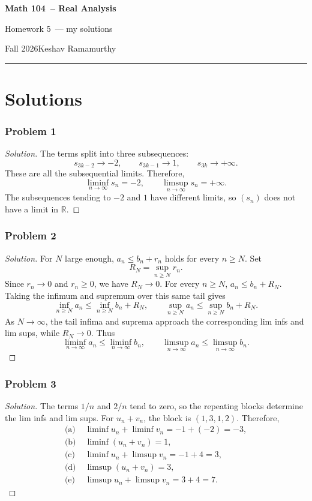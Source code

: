 \documentclass[11pt]{article}
\newcommand{\studentname}{Keshav Ramamurthy}
\newcommand{\coursename}{Math 104}
\newcommand{\courselongname}{Real Analysis}
\newcommand{\assignment}{Homework 5}
\newcommand{\term}{Fall 2026}
\newcommand{\1}{\mathbf{1}}
\theoremstyle{definition}
\newenvironment{solution}{\begin{proof}[Solution]}{\end{proof}}
\begin{document}
\begin{center}
  {\Large\sffamily\bfseries \coursename\ -- \courselongname}\par\vspace{3pt}
  {\sffamily \assignment\ — my solutions}\par\vspace{3pt}
  {\small\sffamily \term\quad\textbullet\quad \studentname}
\end{center}
\medskip
\hrule
\bigskip


\clearpage

\section*{Solutions}
\subsubsection*{Problem 1}
\begin{solution}
The terms split into three subsequences:
\[
s_{3k-2}\longrightarrow -2,\qquad
s_{3k-1}\longrightarrow 1,\qquad
s_{3k}\longrightarrow +\infty.
\]
These are all the subsequential limits. Therefore,
\[
\liminf_{n\to\infty}s_n=-2,\qquad
\limsup_{n\to\infty}s_n=+\infty.
\]
The subsequences tending to $-2$ and $1$ have different limits, so
$(s_n)$ does not have a limit in $\mathbb{R}$.
\end{solution}
\subsubsection*{Problem 2}
\begin{solution}
For $N$ large enough, $a_n\leq b_n+r_n$ holds for every $n\geq N$. Set
\[
R_N=\sup_{n\geq N}r_n.
\]
Since $r_n\to0$ and $r_n\geq0$, we have $R_N\to0$. For every $n\geq N$,
$a_n\leq b_n+R_N$. Taking the infimum and supremum over this same tail gives
\[
\inf_{n\geq N}a_n\leq \inf_{n\geq N}b_n+R_N,\qquad
\sup_{n\geq N}a_n\leq \sup_{n\geq N}b_n+R_N.
\]
As $N\to\infty$, the tail infima and suprema approach the corresponding
lim infs and lim sups, while $R_N\to0$. Thus
\[
\liminf_{n\to\infty}a_n\leq\liminf_{n\to\infty}b_n,\qquad
\limsup_{n\to\infty}a_n\leq\limsup_{n\to\infty}b_n.
\]
\end{solution}
\subsubsection*{Problem 3}
\begin{solution}
The terms $1/n$ and $2/n$ tend to zero, so the repeating blocks determine
the lim infs and lim sups. For $u_n+v_n$, the block is $(1,3,1,2)$.
Therefore,
\[
\begin{aligned}
\text{(a)}\;&\liminf u_n+\liminf v_n=-1+(-2)=-3,\\
\text{(b)}\;&\liminf(u_n+v_n)=1,\\
\text{(c)}\;&\liminf u_n+\limsup v_n=-1+4=3,\\
\text{(d)}\;&\limsup(u_n+v_n)=3,\\
\text{(e)}\;&\limsup u_n+\limsup v_n=3+4=7.
\end{aligned}
\]
\end{solution}
\end{document}
